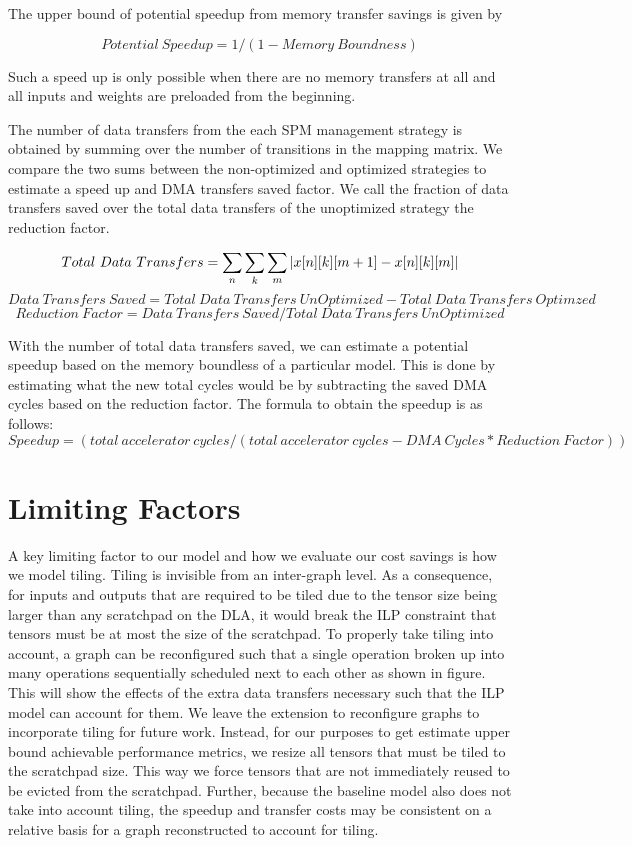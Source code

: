 The upper bound of potential speedup from memory transfer savings is given by

\[
    Potential\ Speedup = 1/(1 - Memory\ Boundness)
\]

Such a speed up is only possible when there are no memory transfers at all and all
inputs and weights are preloaded from the beginning.

%
The number of data transfers from the each SPM management strategy is obtained
by summing over the number of transitions in the mapping matrix. We compare the
two sums between the non-optimized and optimized strategies to estimate a speed
up and DMA transfers saved factor. We call the fraction of data transfers saved
over the total data transfers of the unoptimized strategy the reduction factor.

\[
	Total\ Data\ Transfers = \sum_n \sum_k \sum_m |x[n][k][m+1] - x[n][k][m]|\\
\]
\[
	Data\ Transfers\ Saved = Total\ Data\ Transfers\ UnOptimized - Total\ Data\ Transfers\ Optimzed
\]
\[
	Reduction\ Factor = Data\ Transfers\ Saved / Total\ Data\ Transfers\ UnOptimized
\]

With the number of total data transfers saved, we can estimate a potential speedup
based on the memory boundless of a particular model. This is done by estimating what
the new total cycles would be by subtracting the saved DMA cycles based on the reduction
factor. The formula to obtain the speedup is as follows:
\[
	Speedup = (total\ accelerator\ cycles / (total\ accelerator\ cycles - DMA\ Cycles *
	Reduction\ Factor))
\]

\section{Limiting Factors}
A key limiting factor to our model and how we evaluate our cost savings is how
we model tiling. Tiling is invisible from an inter-graph level. As a
consequence, for inputs and outputs that are required to be tiled due to the
tensor size being larger than any scratchpad on the DLA, it would break the ILP
constraint that tensors must be at most the size of the scratchpad.  To
properly take tiling into account, a graph can be reconfigured such that a
single operation broken up into many operations
sequentially scheduled next to each other as shown in figure. %
This will show the effects of the extra data transfers necessary such that the 
ILP model can account for them. We leave the extension to reconfigure graphs
to incorporate tiling for future work. Instead, for our purposes to get
estimate upper bound achievable performance metrics, we resize all tensors
that must be tiled to the scratchpad size. This way we force tensors that
are not immediately reused to be evicted from the scratchpad. Further, because
the baseline model also does not take into account tiling, the speedup and 
transfer costs may be consistent on a relative basis for a graph reconstructed
to account for tiling.
